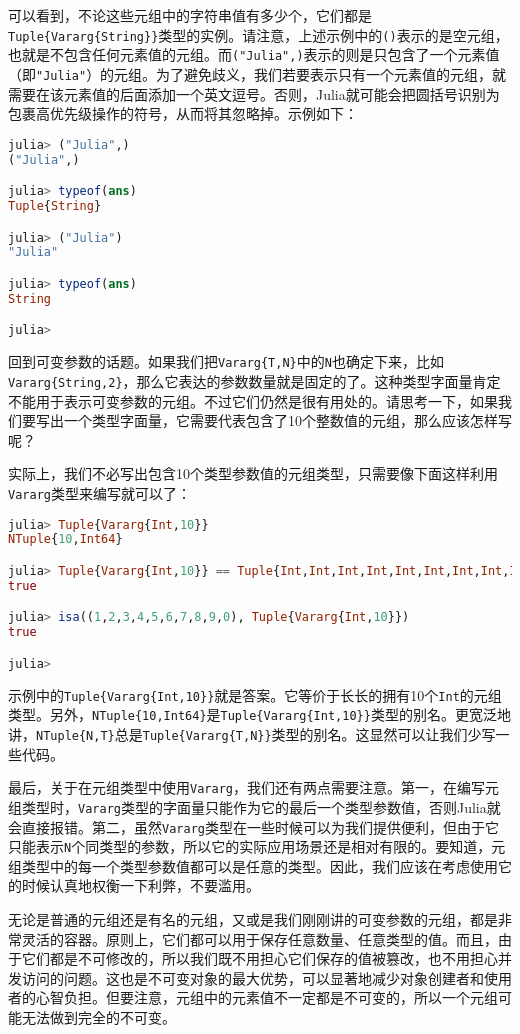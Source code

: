 可以看到，不论这些元组中的字符串值有多少个，它们都是\verb|Tuple{Vararg{String}}|类型的实例。请注意，上述示例中的\verb|()|表示的是空元组，也就是不包含任何元素值的元组。而\verb|("Julia",)|表示的则是只包含了一个元素值（即\verb|"Julia"|）的元组。为了避免歧义，我们若要表示只有一个元素值的元组，就需要在该元素值的后面添加一个英文逗号。否则，Julia就可能会把圆括号识别为包裹高优先级操作的符号，从而将其忽略掉。示例如下：
\begin{lstlisting}[language=julia]
julia> ("Julia",)
("Julia",)

julia> typeof(ans)
Tuple{String}

julia> ("Julia")
"Julia"

julia> typeof(ans)
String

julia> 
\end{lstlisting}

回到可变参数的话题。如果我们把\verb|Vararg{T,N}|中的\verb|N|也确定下来，比如\verb|Vararg{String,2}|，那么它表达的参数数量就是固定的了。这种类型字面量肯定不能用于表示可变参数的元组。不过它们仍然是很有用处的。请思考一下，如果我们要写出一个类型字面量，它需要代表包含了10个整数值的元组，那么应该怎样写呢？

实际上，我们不必写出包含10个类型参数值的元组类型，只需要像下面这样利用\verb|Vararg|类型来编写就可以了：
\begin{lstlisting}[language=julia]
julia> Tuple{Vararg{Int,10}}
NTuple{10,Int64}

julia> Tuple{Vararg{Int,10}} == Tuple{Int,Int,Int,Int,Int,Int,Int,Int,Int,Int}
true

julia> isa((1,2,3,4,5,6,7,8,9,0), Tuple{Vararg{Int,10}})
true

julia> 
\end{lstlisting}

示例中的\verb|Tuple{Vararg{Int,10}}|就是答案。它等价于长长的拥有10个\verb|Int|的元组类型。另外，\verb|NTuple{10,Int64}|是\verb|Tuple{Vararg{Int,10}}|类型的别名。更宽泛地讲，\verb|NTuple{N,T}|总是\verb|Tuple{Vararg{T,N}}|类型的别名。这显然可以让我们少写一些代码。

最后，关于在元组类型中使用\verb|Vararg|，我们还有两点需要注意。第一，在编写元组类型时，\verb|Vararg|类型的字面量只能作为它的最后一个类型参数值，否则Julia就会直接报错。第二，虽然\verb|Vararg|类型在一些时候可以为我们提供便利，但由于它只能表示\verb|N|个同类型的参数，所以它的实际应用场景还是相对有限的。要知道，元组类型中的每一个类型参数值都可以是任意的类型。因此，我们应该在考虑使用它的时候认真地权衡一下利弊，不要滥用。

无论是普通的元组还是有名的元组，又或是我们刚刚讲的可变参数的元组，都是非常灵活的容器。原则上，它们都可以用于保存任意数量、任意类型的值。而且，由于它们都是不可修改的，所以我们既不用担心它们保存的值被篡改，也不用担心并发访问的问题。这也是不可变对象的最大优势，可以显著地减少对象创建者和使用者的心智负担。但要注意，元组中的元素值不一定都是不可变的，所以一个元组可能无法做到完全的不可变。